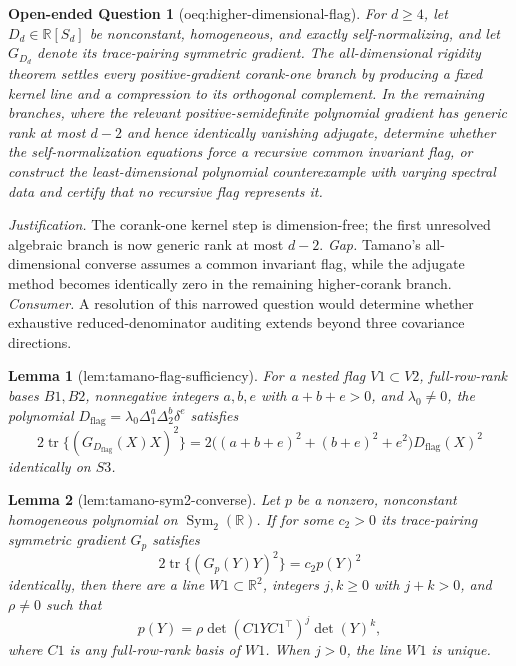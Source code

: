 \documentclass{article}
\newtheorem{lemma}{Lemma}
\newtheorem{openendedquestion}{Open-ended Question}
\begin{document}
\begin{openendedquestion}[oeq:higher-dimensional-flag]\label{oeq:higher-dimensional-flag}
For \(d\geq4\), let \(D_d\in\mathbb R[S_d]\) be nonconstant, homogeneous, and exactly self-normalizing, and let \(G_{D_d}\) denote its trace-pairing symmetric gradient. The all-dimensional rigidity theorem settles every positive-gradient corank-one branch by producing a fixed kernel line and a compression to its orthogonal complement. In the remaining branches, where the relevant positive-semidefinite polynomial gradient has generic rank at most \(d-2\) and hence identically vanishing adjugate, determine whether the self-normalization equations force a recursive common invariant flag, or construct the least-dimensional polynomial counterexample with varying spectral data and certify that no recursive flag represents it.
\end{openendedquestion}
\par\smallskip\noindent \textit{Justification.} The corank-one kernel step is dimension-free; the first unresolved algebraic branch is now generic rank at most \(d-2\). \textit{Gap.} Tamano's all-dimensional converse assumes a common invariant flag, while the adjugate method becomes identically zero in the remaining higher-corank branch. \textit{Consumer.} A resolution of this narrowed question would determine whether exhaustive reduced-denominator auditing extends beyond three covariance directions.

\begin{lemma}[lem:tamano-flag-sufficiency]\label{lem:tamano-flag-sufficiency}
For a nested flag \(V1\subset V2\), full-row-rank bases \(B1,B2\), nonnegative integers \(a,b,e\) with \(a+b+e>0\), and \(\lambda_0\neq0\), the polynomial \(D_{\mathrm{flag}}=\lambda_0\Delta_1^a\Delta_2^b\delta^e\) satisfies
\[
 2\operatorname{tr}\{(G_{D_{\mathrm{flag}}}(X)X)^2\}
 =2\bigl((a+b+e)^2+(b+e)^2+e^2\bigr)D_{\mathrm{flag}}(X)^2
\]
identically on \(S3\).
\end{lemma}

\begin{lemma}[lem:tamano-sym2-converse]\label{lem:tamano-sym2-converse}
Let \(p\) be a nonzero, nonconstant homogeneous polynomial on \(\operatorname{Sym}_{2}(\mathbb R)\).  If for some \(c_2>0\) its trace-pairing symmetric gradient \(G_p\) satisfies
\[
 2\operatorname{tr}\{(G_p(Y)Y)^2\}=c_2p(Y)^2
\]
identically, then there are a line \(W1\subset\mathbb R^2\), integers \(j,k\geq0\) with \(j+k>0\), and \(\rho\neq0\) such that
\[
 p(Y)=\rho\det(C1YC1^{\top})^j\det(Y)^k,
\]
where \(C1\) is any full-row-rank basis of \(W1\).  When \(j>0\), the line \(W1\) is unique.
\end{lemma}
\end{document}
